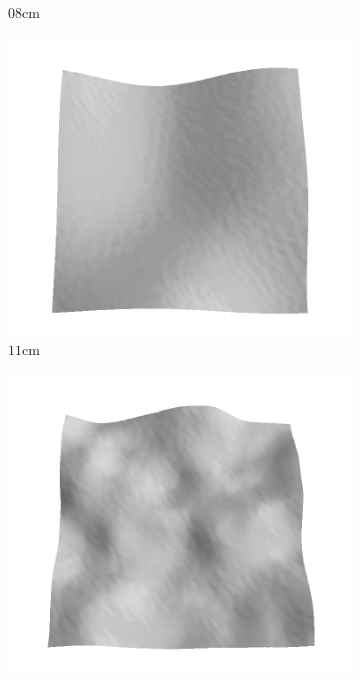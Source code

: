 \documentclass[../document.tex]{subfiles}
\begin{document}
\begin{figure}[htbp]
\begin{subfigure}[b]{0.19\textwidth}
    \caption{$08$cm}
    \end{subfigure}
    \begin{subfigure}[b]{0.19\textwidth}
    \includegraphics[width=\linewidth]{../img/5/train/all/11-patch-3d-majavi-10.png}
    \caption{$11$cm}
    \end{subfigure}
    \begin{subfigure}[b]{0.19\textwidth}
    \includegraphics[width=\linewidth]{../img/5/train/all/14-patch-3d-majavi-11.png}

\end{subfigure}
\end{figure}
\end{document}
